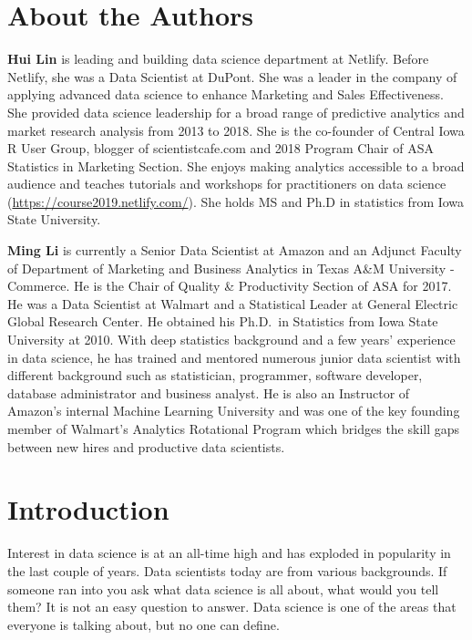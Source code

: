 \documentclass[12pt,]{krantz}
\theoremstyle{definition}
\theoremstyle{definition}
\theoremstyle{definition}
\theoremstyle{remark}
\begin{document}
\chapter*{About the Authors}\label{about-the-authors}


\textbf{Hui Lin} is leading and building data science department at
Netlify. Before Netlify, she was a Data Scientist at DuPont. She was a
leader in the company of applying advanced data science to enhance
Marketing and Sales Effectiveness. She provided data science leadership
for a broad range of predictive analytics and market research analysis
from 2013 to 2018. She is the co-founder of Central Iowa R User Group,
blogger of scientistcafe.com and 2018 Program Chair of ASA Statistics in
Marketing Section. She enjoys making analytics accessible to a broad
audience and teaches tutorials and workshops for practitioners on data
science (\url{https://course2019.netlify.com/}). She holds MS and Ph.D
in statistics from Iowa State University.

\textbf{Ming Li} is currently a Senior Data Scientist at Amazon and an
Adjunct Faculty of Department of Marketing and Business Analytics in
Texas A\&M University - Commerce. He is the Chair of Quality \&
Productivity Section of ASA for 2017. He was a Data Scientist at Walmart
and a Statistical Leader at General Electric Global Research Center. He
obtained his Ph.D.~in Statistics from Iowa State University at 2010.
With deep statistics background and a few years' experience in data
science, he has trained and mentored numerous junior data scientist with
different background such as statistician, programmer, software
developer, database administrator and business analyst. He is also an
Instructor of Amazon's internal Machine Learning University and was one
of the key founding member of Walmart's Analytics Rotational Program
which bridges the skill gaps between new hires and productive data
scientists.

\mainmatter

\chapter{Introduction}\label{introduction}

Interest in data science is at an all-time high and has exploded in
popularity in the last couple of years. Data scientists today are from
various backgrounds. If someone ran into you ask what data science is
all about, what would you tell them? It is not an easy question to
answer. Data science is one of the areas that everyone is talking about,
but no one can define.
\end{document}
